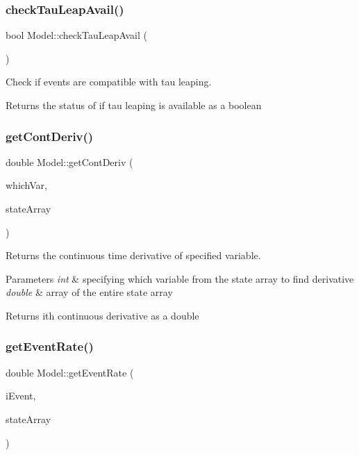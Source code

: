 \subsubsection{\texorpdfstring{check\+Tau\+Leap\+Avail()}{checkTauLeapAvail()}}
{\footnotesize\ttfamily bool Model\+::check\+Tau\+Leap\+Avail (\begin{DoxyParamCaption}{ }\end{DoxyParamCaption})}



Check if events are compatible with tau leaping. 

\begin{DoxyReturn}{Returns}
the status of if tau leaping is available as a boolean 
\end{DoxyReturn}
\mbox{\label{class_model_a6c6960f2621f8ddc441c0f3440052971}} 
\subsubsection{\texorpdfstring{get\+Cont\+Deriv()}{getContDeriv()}}
{\footnotesize\ttfamily double Model\+::get\+Cont\+Deriv (\begin{DoxyParamCaption}\item[{int}]{which\+Var,  }\item[{double $\ast$}]{state\+Array }\end{DoxyParamCaption})}



Returns the continuous time derivative of specified variable. 


\begin{DoxyParams}{Parameters}
{\em int} & specifying which variable from the state array to find derivative \\
\hline
{\em double} & array of the entire state array \\
\hline
\end{DoxyParams}
\begin{DoxyReturn}{Returns}
ith continuous derivative as a double 
\end{DoxyReturn}
\mbox{\label{class_model_a2909caddddccca90faaae708e68226ad}} 
\subsubsection{\texorpdfstring{get\+Event\+Rate()}{getEventRate()}}
{\footnotesize\ttfamily double Model\+::get\+Event\+Rate (\begin{DoxyParamCaption}\item[{int}]{i\+Event,  }\item[{double $\ast$}]{state\+Array }\end{DoxyParamCaption})}



